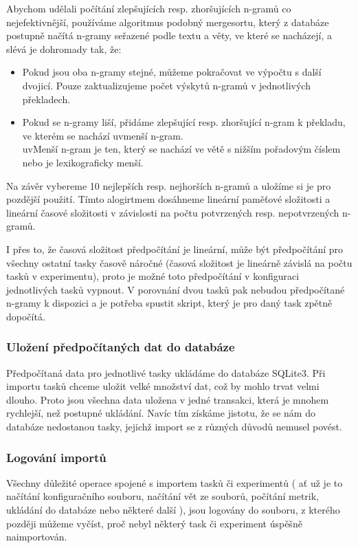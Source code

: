 Abychom udělali počítání zlepšujících resp. zhoršujících n-gramů co nejefektivnější,
  používáme algoritmus podobný mergesortu,
  který z databáze postupně načítá n-gramy seřazené podle textu a věty, ve které se nacházejí, 
  a slévá je dohromady tak, že:

\begin{itemize}
  \item Pokud jsou oba n-gramy stejné, můžeme pokračovat ve výpočtu s další dvojicí.
    Pouze zaktualizujeme počet výskytů n-gramů v jednotlivých překladech. 
  \item Pokud se n-gramy liší, přidáme zlepšující resp. zhoršující n-gram k překladu,
    ve kterém se nachází uv{menší n-gram}. \\
    uv{Menší n-gram} je ten, který se nachází ve větě s nižším pořadovým číslem
    nebo je lexikograficky menší.
\end{itemize}

Na závěr vybereme 10 nejlepších resp. nejhorších n-gramů
  a uložíme si je pro pozdější použití.
Tímto alogirtmem dosáhneme lineární paměťové složitosti a
  lineární časové složitosti v závislosti na počtu potvrzených resp. nepotvrzených n-gramů.

I přes to, že časová složitost předpočítání je lineární,
  může být předpočítání pro všechny ostatní tasky časově náročné
  (časová složitost je lineárně závislá na počtu tasků v experimentu),
  proto je možné toto předpočítání v konfiguraci jednotlivých tasků vypnout.
V porovnání dvou tasků pak nebudou předpočítané n-gramy k dispozici
  a je potřeba spustit skript,
  který je pro daný task zpětně dopočítá.

\subsubsection{Uložení předpočítaných dat do databáze}
Předpočítaná data pro jednotlivé tasky ukládáme do databáze SQLite3.
Při importu tasků chceme uložit velké množství dat,
  což by mohlo trvat velmi dlouho.
Proto jsou všechna data uložena v jedné transakci,
  která je mnohem rychlejší,
  než postupné ukládání.
Navíc tím získáme jistotu,
  že se nám do databáze nedostanou tasky,
  jejichž import se z různých důvodů nemusel povést.
 
\subsubsection{Logování importů}
Všechny důležité operace spojené s importem tasků či experimentů
  ( ať už je to načítání konfiguračního souboru, načítání vět ze souborů,
  počítání metrik, ukládání do databáze nebo některé další ), 
  jsou logovány do souboru,
  z kterého později můžeme vyčíst,
  proč nebyl některý task či experiment úspěšně naimportován. 


